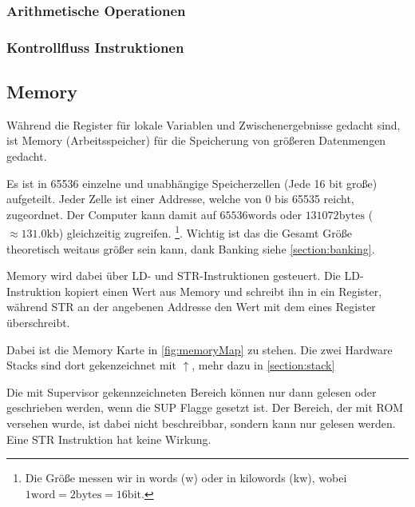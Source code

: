 \documentclass{scrartcl}
\begin{document}
\subsubsection{\label{section:arthimatik}Arithmetische Operationen}

\subsubsection{\label{section:controllflow}Kontrollfluss Instruktionen}




\subsection{\label{section:memory}Memory}

Während die Register für lokale Variablen und Zwischenergebnisse gedacht sind, ist Memory (Arbeitsspeicher) für die Speicherung von größeren Datenmengen gedacht.

Es ist in 65536 einzelne und unabhängige Speicherzellen (Jede 16 bit große) aufgeteilt. Jeder Zelle ist einer Addresse, welche von 0 bis 65535 reicht, zugeordnet. Der Computer kann damit auf $65536 \text{words}$ oder $131072 \text{bytes}$ ($\approx 131.0 \text{kb}$) gleichzeitig zugreifen.
\footnote{Die Größe messen wir in words (w) oder in kilowords (kw), wobei $1 \text{word} = 2 \text{bytes} = 16 \text{bit}$.}. Wichtig ist das die Gesamt Größe theoretisch weitaus größer sein kann, dank Banking siehe \autoref{section:banking}.

Memory wird dabei über LD- und STR-Instruktionen gesteuert. Die LD-Instruktion kopiert einen Wert aus Memory und schreibt ihn in ein Register, während STR an der angebenen Addresse den Wert mit dem eines Register überschreibt.

Dabei ist die Memory Karte in \autoref{fig:memoryMap} zu stehen. Die zwei Hardware Stacks sind dort gekenzeichnet mit $\uparrow$, mehr dazu in \autoref{section:stack}

Die mit Supervisor gekennzeichneten Bereich können nur dann gelesen oder geschrieben werden, wenn die SUP Flagge gesetzt ist. Der Bereich, der mit ROM versehen wurde, ist dabei nicht beschreibbar, sondern kann nur gelesen werden. Eine STR Instruktion hat keine Wirkung.
\end{document}
